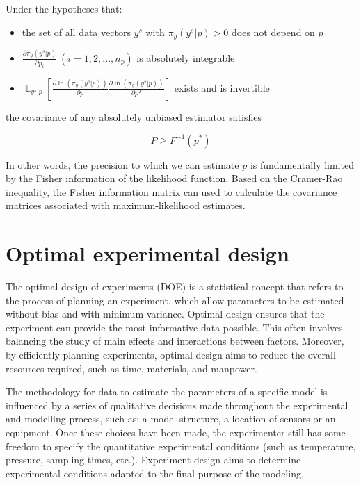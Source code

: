 \documentclass[]{scrartcl}
\begin{document}
Under the hypotheses that:

\begin{itemize}
	\item the set of all data vectors $y^s$ with $\pi_y(y^s|p) > 0$ does not depend on $p$
	\item $\frac{\partial \pi_y(y^s|p)}{\partial p_i}~\left(i=1,2,...,n_p\right)$ is absolutely integrable
	\item $\mathop{\mathbb{E}}_{y^s|p} \left[ \frac{\partial \ln (\pi_y (y^s|p))}{\partial p} \frac{\partial \ln (\pi_y (y^s|p))}{\partial p^T} \right]$ exists and is invertible
\end{itemize}

the covariance of any absolutely unbiased estimator satisfies

\begin{equation}
	P \geq F^{-1}(p^*)
\end{equation}

In other words, the precision to which we can estimate $p$ is fundamentally limited by the Fisher information of the likelihood function. Based on the Cramer-Rao inequality, the Fisher information matrix can used to calculate the covariance matrices associated with maximum-likelihood estimates.

\section{Optimal experimental design}

The optimal design of experiments (DOE) is a statistical concept that refers to the process of planning an experiment, which allow parameters to be estimated without bias and with minimum variance. Optimal design ensures that the experiment can provide the most informative data possible. This often involves balancing the study of main effects and interactions between factors. Moreover, by efficiently planning experiments, optimal design aims to reduce the overall resources required, such as time, materials, and manpower.

The methodology for data to estimate the parameters of a specific model is influenced by a series of qualitative decisions made throughout the experimental and modelling process, such as: a model structure, a location of sensors or an equipment. Once these choices have been made, the experimenter still has some freedom to specify the quantitative experimental conditions (such as temperature, pressure, sampling times, etc.). Experiment design aims to determine experimental conditions adapted to the final purpose of the modeling. 
\end{document}
